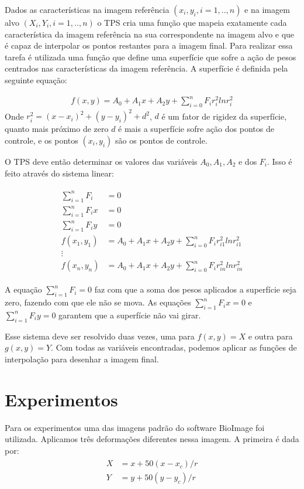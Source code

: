 \documentclass[]{spie}  %
\begin{document}
	Dados as características na imagem referência $(x_i,y_i, i=1,..,n)$ e na imagem alvo $(X_i,Y_i, i=1,..,n)$
o TPS cria uma função que mapeia exatamente cada característica da imagem referência na sua
correspondente na imagem alvo e que é capaz de interpolar os pontos restantes para a imagem final. Para realizar
essa tarefa é utilizada uma função que define uma superfície que sofre a ação de pesos centrados nas
características da imagem referência. A superfície é definida pela seguinte equação:

\begin{align}
	f(x,y) = A_0 + A_1x + A_2y + \sum_{i=0}^n F_i r_i^2 ln r_i^2
\end{align}
Onde $r_i^2 = (x-x_i)^2 + (y-y_i)^2 + d^2$, $d$ é um fator de rigidez da superfície, quanto mais próximo de 
zero $d$ é mais a superfície sofre ação dos pontos de controle, e os pontos $(x_i, y_i)$ são os pontos de controle.

	O TPS deve então determinar os valores das variáveis $A_0, A_1, A_2$ e dos $F_i$. 
Isso é feito através do sistema linear:

\begin{align}
\begin{split}
	\sum_{i=1}^n F_i &= 0 \\
	\sum_{i=1}^n F_ix &= 0 \\
	\sum_{i=1}^n F_iy &= 0 \\
	f(x_1,y_1) &= A_0 + A_1x + A_2y + \sum_{i=0}^n F_i r_{i1}^2 ln r_{i1}^2 \\
	\vdots \\
	f(x_n,y_n) &= A_0 + A_1x + A_2y + \sum_{i=0}^n F_i r_{in}^2 ln r_{in}^2
\end{split}
\end{align}

A equação $\sum_{i=1}^n F_i = 0$ faz com que a soma dos pesos aplicados a superfície seja zero, fazendo com que
ele não se mova. As equações $\sum_{i=1}^n F_ix = 0$ e $\sum_{i=1}^n F_iy = 0$ garantem que a superfície não vai girar.

	Esse sistema deve ser resolvido duas vezes, uma para $f(x,y) = X$ e outra para $g(x,y) = Y$. Com todas as variáveis
encontradas, podemos aplicar as funções de interpolação para desenhar a imagem final.

\section{Experimentos}
	Para os experimentos uma das imagens padrão do software BioImage foi utilizada. Aplicamos três deformações
diferentes nessa imagem. A primeira é dada por:
\begin{align}
\begin{split}
	X &= x + 50(x-x_c)/r \\
	Y &= y + 50(y-y_c)/r 
\end{split} 
\end{align}
\end{document}
